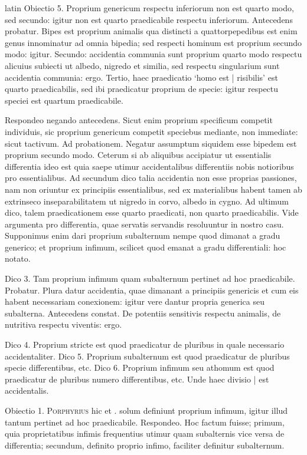 \begin{otherlanguage*}{latin}
\pstart
  Obiectio 5. Proprium genericum respectu inferiorum non est quarto modo, sed secundo: igitur non est quarto praedicabile respectu inferiorum. Antecedens probatur. Bipes est proprium animalis qua distincti a quattorpepedibus est enim genus innominatur ad omnia bipedia; sed respecti hominum est proprium secundo modo: igitur. Secundo: accidentia communia sunt proprium quarto modo respectu alicuius subiecti ut albedo, nigredo et similia, sed respectu singularium sunt accidentia communia: ergo. Tertio, haec praedicatio `homo est \textnormal{|}   risibilis' est quarto praedicabilis, sed ibi praedicatur proprium de specie: igitur respectu speciei est quartum praedicabile. 
\pend

\pstart
  Respondeo negando antecedens. Sicut enim proprium specificum competit individuis, sic proprium genericum competit speciebus mediante, non immediate: sicut tactivum. Ad probationem. Negatur assumptum siquidem esse bipedem est proprium secundo modo. Ceterum si ab aliquibus accipiatur ut essentialis differentia ideo est quia saepe utimur accidentalibus differentiis nobis notioribus pro essentialibus. Ad secundum dico talia accidentia non esse proprias passiones, nam non oriuntur ex principiis essentialibus, sed ex materialibus habent tamen ab extrinseco inseparabilitatem ut nigredo in corvo, albedo in cygno. Ad ultimum dico, talem praedicationem esse quarto praedicati, non quarto praedicabilis. Vide argumenta pro differentia, quae servatis servandis resoluuntur in nostro casu. Supponimus enim dari proprium subalternum nempe quod dimanat a gradu generico; et proprium infimum, scilicet quod emanat a gradu differentiali: hoc notato. 
\pend

\pstart
  Dico 3. Tam proprium infimum quam subalternum pertinet ad hoc praedicabile. Probatur. Plura datur accidentia, quae dimanant a principiis genericis et cum eis habent necessariam conexionem: igitur vere dantur propria generica seu subalterna. Antecedens constat. De potentiis sensitivis respectu animalis, de nutritiva respectu viventis: ergo. 
\pend

\pstart
  Dico 4. Proprium stricte est quod praedicatur de pluribus in quale necessario accidentaliter. Dico 5. Proprium subalternum est quod praedicatur de pluribus specie differentibus, etc. Dico 6. Proprium infimum seu athomum est quod praedicatur de pluribus numero differentibus, etc. Unde haec divisio \textnormal{|} est accidentalis. 
\pend

\pstart
  Obiectio 1. \textsc{Porphyrius} hic et . solum definiunt proprium infimum, igitur illud tantum pertinet ad hoc praedicabile. Respondeo. Hoc factum fuisse; primum, quia proprietatibus infimis frequentius utimur quam subalternis vice versa de differentia; secundum, definito proprio infimo, faciliter definitur subalternum. 
\pend


\end{otherlanguage*}
